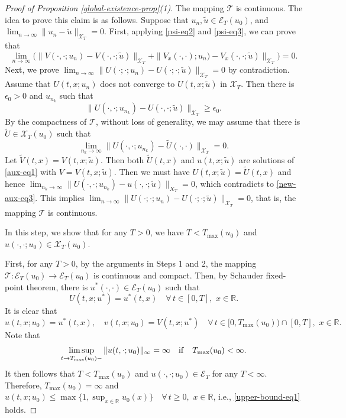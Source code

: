 \documentclass[11pt]{article} %
\theoremstyle{remark}
\theoremstyle{remark}
\numberwithin{equation}{section}
\numberwithin{figure}{section}
\numberwithin{table}{section}
\newcommand\RR{\ensuremath{\mathbb{R}}}
\begin{document}
\begin{proof} [Proof of Proposition \ref{global-existence-prop}(1)]
 The mapping $\mathcal{T}$ is continuous. The idea to  prove this claim is as follows.  Suppose that $u_n,\tilde u\in \mathcal{E}_T(u_0)$, and $\lim_{n\to\infty}\|u_n-\tilde u\|_{\mathcal{X}_T}=0$.  First,  applying \eqref{psi-eq2} and \eqref{psi-eq3}, we can prove that
$$
\lim_{n\to\infty}\Big( \|V(\cdot,\cdot;u_n)-V(\cdot,\cdot;\tilde u)\|_{\mathcal{X}_T}+
\|V_x(\cdot,\cdot);u_n)-V_x(\cdot,\cdot;\tilde u)\|_{\mathcal{X}_T}\Big)=0.
$$
Next, we prove $\lim_{n\to\infty}\|U(\cdot;\cdot;u_n)-U(\cdot;\cdot;\tilde u)\|_{\mathcal{X}_T}=0$
by contradiction. Assume that  $U(t,x;u_n)$ does not converge to $U(t,x;\tilde u)$ in $\mathcal{X}_T$. Then there is $\epsilon_0>0$ and $u_{n_k}$ such that
\begin{equation}
\label{new-aux-eq3}
\|U(\cdot,\cdot;u_{n_k})-U(\cdot,\cdot;\tilde u)\|_{\mathcal{X}_T}\ge \epsilon_0.
\end{equation}
By the compactness of $\mathcal{T}$, without loss of generality, we may assume that
there is
$\tilde U\in\mathcal{X}_T(u_0)$ such that
$$
\lim_{n_k\to\infty}\|U(\cdot,\cdot;u_{n_k})-\tilde U(\cdot,\cdot)\|_{\mathcal{X}_T}=0.
$$
Let $\tilde V(t,x)=V(t,x;\tilde u)$. Then both $\tilde U(t,x)$ and $u(t,x;\tilde u)$ are solutions of
\eqref{aux-eq1} with $V=V(t,x;\tilde u)$.
Then we must have $U(t,x;\tilde u)=\tilde U(t,x)$ and hence $\lim_{n_k\to\infty}\|U(\cdot,\cdot;u_{n_k})-u(\cdot,\cdot;\tilde u)\|_{X_T}=0$, which contradicts to \eqref{new-aux-eq3}.
This implies $\lim_{n\to\infty}\|U(\cdot;\cdot;u_n)-U(\cdot;\cdot;\tilde u)\|_{\mathcal{X}_T}=0$, that is, the mapping $\mathcal{T}$ is continuous. 





\smallskip

  In this step, we show that for any $T>0$,  we have $T<T_{\max}(u_0)$ and $u(\cdot,\cdot;u_0)\in\mathcal{X}_T(u_0)$.

\smallskip


 First, for any $T>0$, by the arguments in Steps 1 and 2, the mapping $\mathcal{T}:\mathcal{E}_T(u_0)\to\mathcal{E}_T(u_0)$ is continuous and compact. Then,  by Schauder fixed-point theorem, there is $u^*(\cdot,\cdot)\in \mathcal{E}_T(u_0)$ such that
$$
U(t,x;u^*)=u^*(t,x)\quad \forall\, t\in [0,T],\,\, x\in\RR.
$$
It is clear that 
$$
u(t,x;u_0)=u^*(t,x),\quad v(t,x;u_0)=V(t,x;u^*)\quad \forall\, t\in [0,T_{\max}(u_0))\cap [0,T],\,\, x\in\RR.
$$
Note that
$$
\limsup_{t\to T_{\max}(u_0)-}\|u(t,\cdot;u_0)\|_\infty=\infty \quad {\rm if}\quad T_{\max}(u_0)<\infty.
$$
It then follows that  $T<T_{\max}(u_0)$ and $u(\cdot,\cdot;u_0)\in \mathcal{E}_T$
for any $T<\infty$. Therefore, $T_{\max}(u_0)=\infty$ and $u(t,x;u_0)\le \max\{1,\sup_{x\in\RR}u_0(x)\}\quad \forall\, t\ge 0,\,\, x\in\RR$,  i.e., \eqref{upper-bound-eq1} holds.


\end{proof}
\end{document}
